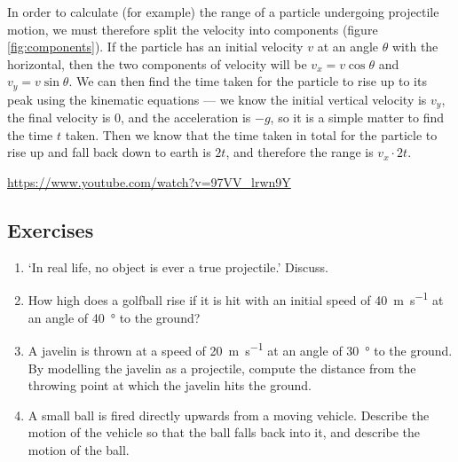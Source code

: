 \documentclass[a4paper]{amsbook}
\begin{document}
In order to calculate (for example) the range of a particle undergoing projectile motion, we must therefore split
the velocity into components (figure \ref{fig:components}). If the particle has an initial velocity $ v $ at an angle $ \theta $
with the horizontal, then the two components of velocity will be $ v_x = v \cos \theta $ and $ v_y = v \sin \theta $. We can then
find the time taken for the particle to rise up to its peak using the kinematic equations --- we know the initial vertical
velocity is $ v_y $, the final velocity is 0, and the acceleration is $ -g $, so it is a simple matter to find the time $ t $ taken.
Then we know that the time taken in total for the particle to rise up and fall back down to earth is $ 2t $, and therefore
the range is $ v_x \cdot 2t $.

\begin{center}
\begin{tcolorbox}[width=0.8\textwidth,colback={red},title={\textbf{Go and watch...}},colbacktitle=yellow,coltitle=blue]
  \textcolor{white}{\url{https://www.youtube.com/watch?v=97VV_lrwn9Y}}
\end{tcolorbox}
\end{center}

\subsection{Exercises}
\begin{enumerate}
  \item `In real life, no object is ever a true projectile.' Discuss.
  \item How high does a golfball rise if it is hit with an initial speed of \SI{40}{\metre\per\second} at an angle
        of \SI{40}{\degree} to the ground?
  \item A javelin is thrown at a speed of \SI{20}{\metre\per\second} at an angle of \SI{30}{\degree} to the ground. By modelling
        the javelin as a projectile, compute the distance from the throwing point at which the javelin hits the ground.
  \item A small ball is fired directly upwards from a moving vehicle. Describe the motion of the vehicle so that the ball falls
        back into it, and describe the motion of the ball.
\end{enumerate}
\end{document}
